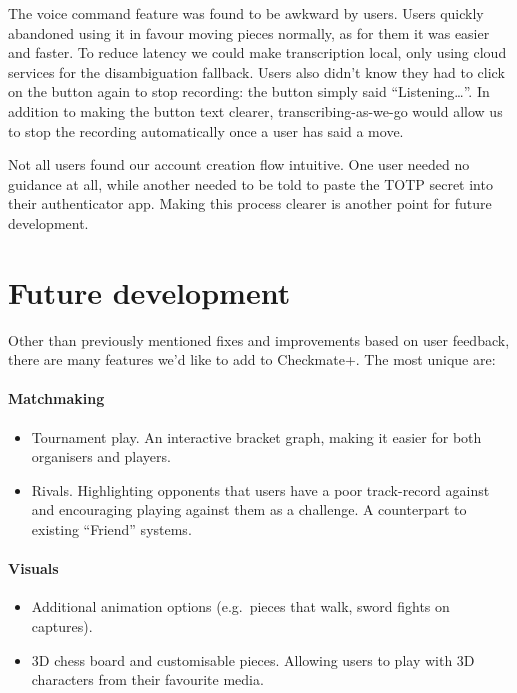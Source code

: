 \documentclass[12pt,titlepage,a4paper]{article}
\begin{document}
    The voice command feature was found to be awkward by users. Users quickly abandoned using it in favour moving pieces normally, as for them it was easier and faster. To reduce latency we could make transcription local, only using cloud services for the disambiguation fallback. Users also didn't know they had to click on the button again to stop recording: the button simply said ``Listening\ldots''. In addition to making the button text clearer, transcribing-as-we-go would allow us to stop the recording automatically once a user has said a move.

    Not all users found our account creation flow intuitive. One user needed no guidance at all, while another needed to be told to paste the TOTP secret into their authenticator app. Making this process clearer is another point for future development.


    \section{Future development}
    \label{Future development}

    Other than previously mentioned fixes and improvements based on user feedback, there are many features we'd like to add to Checkmate+. The most unique are:

    \paragraph{Matchmaking}
    \begin{itemize}[noitemsep]
        \item Tournament play. An interactive bracket graph, making it easier for both organisers and players.
        \item Rivals. Highlighting opponents that users have a poor track-record against and encouraging playing against them as a challenge. A counterpart to existing ``Friend'' systems.
    \end{itemize}

    \paragraph{Visuals}
    \begin{itemize}[noitemsep]
        \item Additional animation options (e.g.\ pieces that walk, sword fights on captures).
        \item 3D chess board and customisable pieces. Allowing users to play with 3D characters from their favourite media.
    \end{itemize}
\end{document}
